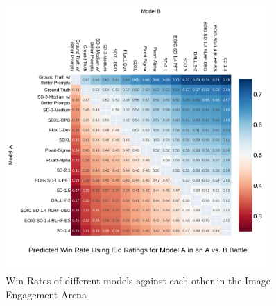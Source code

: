    

\begin{figure}
     \centering
     \includegraphics[width=0.9\textwidth]{images/arena_win_rates.pdf}
     \caption{Win Rates of different models against each other in the Image Engagement Arena}
     \label{img:image_persuasion_arena_win_rates}
\end{figure}




